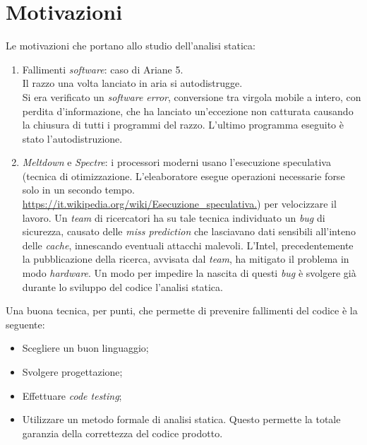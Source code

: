 \documentclass[10pt,                    %
               a4paper,                 %
               twoside,                 %
               openright,               %
               english,                 
               italian,                 
               ]{book}
\begin{document}
\section{Motivazioni}
Le motivazioni che portano allo studio dell'analisi statica:
\begin{enumerate}
\item Fallimenti \textit{software}: caso di Ariane 5.\\
Il razzo una volta lanciato in aria si autodistrugge.\\
Si era verificato un \textit{software error}, conversione tra virgola mobile a intero, con perdita d'informazione, che ha lanciato un'eccezione non catturata causando la chiusura di tutti i programmi del razzo. L'ultimo programma eseguito \`e stato l'autodistruzione.
\item \textit{Meltdown} e \textit{Spectre}: i processori moderni usano l'esecuzione speculativa (tecnica di otimizzazione. L'eleaboratore esegue operazioni necessarie forse solo in un secondo tempo. \url{https://it.wikipedia.org/wiki/Esecuzione_speculativa.}) per velocizzare il lavoro. Un \textit{team} di ricercatori ha su tale tecnica individuato un \textit{bug} di sicurezza, causato delle \textit{miss prediction} che lasciavano dati sensibili all'inteno delle \textit{cache}, innescando eventuali attacchi malevoli.
L'Intel, precedentemente la pubblicazione della ricerca, avvisata dal \textit{team}, ha mitigato il problema in modo \textit{hardware}. Un modo per impedire la nascita di questi \textit{bug} \`e svolgere gi\`a durante lo sviluppo del codice l'analisi statica. 
\end{enumerate}
\noindent
Una buona tecnica, per punti, che permette di prevenire fallimenti del codice \`e la seguente:
\begin{itemize}
\item Scegliere un buon linguaggio;
\item Svolgere progettazione;
\item Effettuare \textit{code testing};
\item Utilizzare un metodo formale di analisi statica. Questo permette la totale garanzia della correttezza del codice prodotto.
\end{itemize}
\newpage
\end{document}
